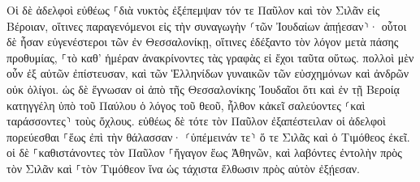 \documentclass{openreader}
\begin{document}
Οἱ δὲ ἀδελφοὶ εὐθέως ⸀διὰ νυκτὸς ἐξέπεμψαν τόν τε Παῦλον καὶ τὸν Σιλᾶν εἰς Βέροιαν, οἵτινες παραγενόμενοι εἰς τὴν συναγωγὴν ⸂τῶν Ἰουδαίων ἀπῄεσαν⸃· 
οὗτοι δὲ ἦσαν εὐγενέστεροι τῶν ἐν Θεσσαλονίκῃ, οἵτινες ἐδέξαντο τὸν λόγον μετὰ πάσης προθυμίας, ⸀τὸ καθ’ ἡμέραν ἀνακρίνοντες τὰς γραφὰς εἰ ἔχοι ταῦτα οὕτως. 
πολλοὶ μὲν οὖν ἐξ αὐτῶν ἐπίστευσαν, καὶ τῶν Ἑλληνίδων γυναικῶν τῶν εὐσχημόνων καὶ ἀνδρῶν οὐκ ὀλίγοι. 
ὡς δὲ ἔγνωσαν οἱ ἀπὸ τῆς Θεσσαλονίκης Ἰουδαῖοι ὅτι καὶ ἐν τῇ Βεροίᾳ κατηγγέλη ὑπὸ τοῦ Παύλου ὁ λόγος τοῦ θεοῦ, ἦλθον κἀκεῖ σαλεύοντες ⸂καὶ ταράσσοντες⸃ τοὺς ὄχλους. 
εὐθέως δὲ τότε τὸν Παῦλον ἐξαπέστειλαν οἱ ἀδελφοὶ πορεύεσθαι ⸀ἕως ἐπὶ τὴν θάλασσαν· ⸂ὑπέμεινάν τε⸃ ὅ τε Σιλᾶς καὶ ὁ Τιμόθεος ἐκεῖ. 
οἱ δὲ ⸀καθιστάνοντες τὸν Παῦλον ⸀ἤγαγον ἕως Ἀθηνῶν, καὶ λαβόντες ἐντολὴν πρὸς τὸν Σιλᾶν καὶ ⸀τὸν Τιμόθεον ἵνα ὡς τάχιστα ἔλθωσιν πρὸς αὐτὸν ἐξῄεσαν. 
\end{document}
